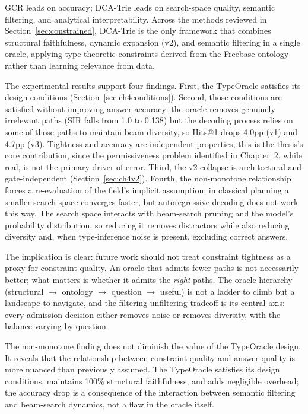 GCR leads on accuracy; DCA-Trie leads on search-space quality, semantic filtering, and analytical interpretability. Across the methods reviewed in Section~\ref{sec:constrained}, DCA-Trie is the only framework that combines structural faithfulness, dynamic expansion (v2), and semantic filtering in a single oracle, applying type-theoretic constraints derived from the Freebase ontology rather than learning relevance from data.

The experimental results support four findings. First, the TypeOracle satisfies its design conditions (Section~\ref{sec:ch4conditions}). Second, those conditions are satisfied without improving answer accuracy: the oracle removes genuinely irrelevant paths (SIR falls from 1.0 to 0.138) but the decoding process relies on some of those paths to maintain beam diversity, so Hits@1 drops 4.0pp (v1) and 4.7pp (v3). Tightness and accuracy are independent properties; this is the thesis's core contribution, since the permissiveness problem identified in Chapter~2, while real, is not the primary driver of error. Third, the v2 collapse is architectural and gate-independent (Section~\ref{sec:ch4v2}). Fourth, the non-monotone relationship forces a re-evaluation of the field's implicit assumption: in classical planning a smaller search space converges faster, but autoregressive decoding does not work this way. The search space interacts with beam-search pruning and the model's probability distribution, so reducing it removes distractors while also reducing diversity and, when type-inference noise is present, excluding correct answers.

The implication is clear: future work should not treat constraint tightness as a proxy for constraint quality. An oracle that admits fewer paths is not necessarily better; what matters is whether it admits the \textit{right} paths. The oracle hierarchy (structural $\to$ ontology $\to$ question $\to$ useful) is not a ladder to climb but a landscape to navigate, and the filtering-unfiltering tradeoff is its central axis: every admission decision either removes noise or removes diversity, with the balance varying by question.

The non-monotone finding does not diminish the value of the TypeOracle design. It reveals that the relationship between constraint quality and answer quality is more nuanced than previously assumed. The TypeOracle satisfies its design conditions, maintains 100\% structural faithfulness, and adds negligible overhead; the accuracy drop is a consequence of the interaction between semantic filtering and beam-search dynamics, not a flaw in the oracle itself.

